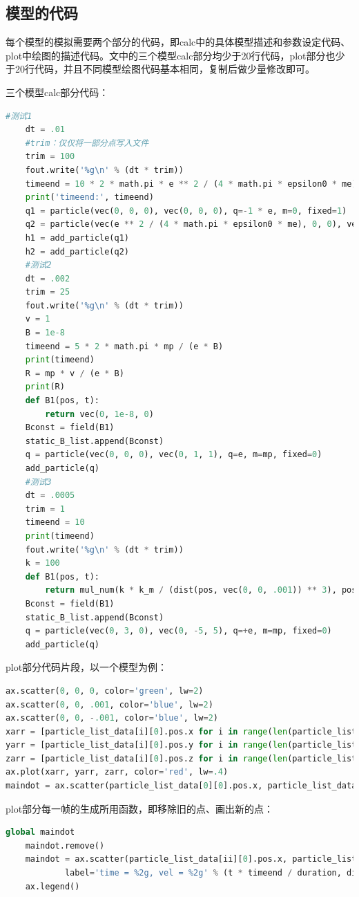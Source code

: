 \documentclass[UTF-8,cs4size]{ctexart}
\begin{document}
\subsection{模型的代码}
每个模型的模拟需要两个部分的代码，即calc中的具体模型描述和参数设定代码、plot中绘图的描述代码。文中的三个模型calc部分均少于20行代码，plot部分也少于20行代码，并且不同模型绘图代码基本相同，复制后做少量修改即可。


三个模型calc部分代码：
\begin{lstlisting}[language=Python]
    #测试1
    dt = .01
    #trim：仅仅将一部分点写入文件
    trim = 100
    fout.write('%g\n' % (dt * trim))
    timeend = 10 * 2 * math.pi * e ** 2 / (4 * math.pi * epsilon0 * me)
    print('timeend:', timeend)
    q1 = particle(vec(0, 0, 0), vec(0, 0, 0), q=-1 * e, m=0, fixed=1)
    q2 = particle(vec(e ** 2 / (4 * math.pi * epsilon0 * me), 0, 0), vec(0, 1, 0), q=1 * e, m=1 * me, fixed=0)
    h1 = add_particle(q1)
    h2 = add_particle(q2)
    #测试2
    dt = .002
    trim = 25
    fout.write('%g\n' % (dt * trim))
    v = 1
    B = 1e-8
    timeend = 5 * 2 * math.pi * mp / (e * B)
    print(timeend)
    R = mp * v / (e * B)
    print(R)
    def B1(pos, t):
        return vec(0, 1e-8, 0)
    Bconst = field(B1)
    static_B_list.append(Bconst)
    q = particle(vec(0, 0, 0), vec(0, 1, 1), q=e, m=mp, fixed=0)
    add_particle(q)
    #测试3
    dt = .0005
    trim = 1
    timeend = 10
    print(timeend)
    fout.write('%g\n' % (dt * trim))
    k = 100
    def B1(pos, t):
        return mul_num(k * k_m / (dist(pos, vec(0, 0, .001)) ** 3), pos - vec(0, 0, 1)) - mul_num(k * k_m / (dist(pos, vec(0, 0, -1)) ** 3), pos - vec(0, 0, -.001))
    Bconst = field(B1)
    static_B_list.append(Bconst)
    q = particle(vec(0, 3, 0), vec(0, -5, 5), q=+e, m=mp, fixed=0)
    add_particle(q)
\end{lstlisting}
plot部分代码片段，以一个模型为例：
\begin{lstlisting}[language=Python]
ax.scatter(0, 0, 0, color='green', lw=2)
ax.scatter(0, 0, .001, color='blue', lw=2)
ax.scatter(0, 0, -.001, color='blue', lw=2)
xarr = [particle_list_data[i][0].pos.x for i in range(len(particle_list_data))]
yarr = [particle_list_data[i][0].pos.y for i in range(len(particle_list_data))]
zarr = [particle_list_data[i][0].pos.z for i in range(len(particle_list_data))]
ax.plot(xarr, yarr, zarr, color='red', lw=.4)
maindot = ax.scatter(particle_list_data[0][0].pos.x, particle_list_data[0][0].pos.y, particle_list_data[0][0].pos.z, color='blue', lw=.2)
\end{lstlisting}
plot部分每一帧的生成所用函数，即移除旧的点、画出新的点：
\begin{lstlisting}[language=Python]
    global maindot
    maindot.remove()
    maindot = ax.scatter(particle_list_data[ii][0].pos.x, particle_list_data[ii][0].pos.y, particle_list_data[ii][0].pos.z, color='red', lw=.2, \
            label='time = %2g, vel = %2g' % (t * timeend / duration, dist(particle_list_data[ii][0].vel)))
    ax.legend()
\end{lstlisting}
\end{document}

